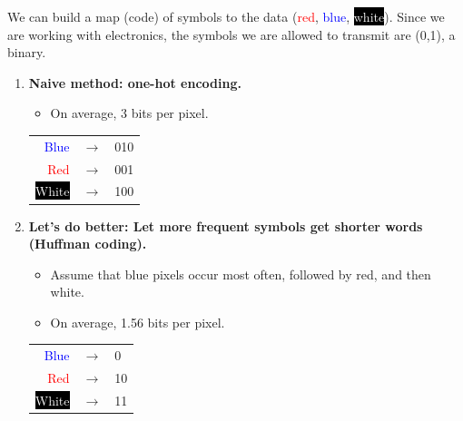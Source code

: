 We can build a map (code) of symbols to the data (\textcolor{red}{red}, \textcolor{blue}{blue}, \colorbox{black}{\textcolor{white}{white}}). Since we are working with electronics, the symbols we are allowed to transmit are (0,1), a binary.



\begin{enumerate}
    \item \textbf{Naive method: one-hot encoding.}
          \begin{itemize}
              \item On average, 3 bits per pixel.
          \end{itemize}
          \begin{center}
              \begin{tabular}{rcl}
                  \textcolor{blue}{Blue}                     & $\longrightarrow$ & 010 \\
                  \textcolor{red}{Red}                       & $\longrightarrow$ & 001 \\
                  \colorbox{black}{\textcolor{white}{White}} & $\longrightarrow$ & 100
              \end{tabular}
          \end{center}
    \item \textbf{Let's do better: Let more frequent symbols get shorter words (Huffman coding).}
          \begin{itemize}
              \item Assume that blue pixels occur most often, followed by red, and then white.
              \item On average, 1.56 bits per pixel.
          \end{itemize}
          \begin{center}
              \begin{tabular}{rcl}
                  \textcolor{blue}{Blue}                     & $\longrightarrow$ & 0  \\
                  \textcolor{red}{Red}                       & $\longrightarrow$ & 10 \\
                  \colorbox{black}{\textcolor{white}{White}} & $\longrightarrow$ & 11
              \end{tabular}
          \end{center}
\end{enumerate}


